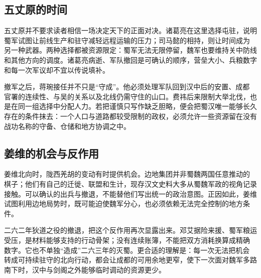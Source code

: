 \subsection{五丈原的时间}

五丈原并不要求读者相信一场决定天下的正面对决。诸葛亮在这里选择屯驻，说明
蜀军试图让前线生产和驻守减轻远程运输的压力；司马懿的相持，则让时间成为
另一种武器。两种选择都被资源限定：蜀军无法无限停留，魏军也要维持关中防线
和其他方向的调度。诸葛亮病逝、军队撤回是可确认的顺序，营垒大小、兵粮数字
和每一次军议却不宜以传说填补。

撤军之后，蒋琬接任并不只是“守成”。他必须处理军队回到汉中后的安置、成都
官署的连续性、与吴的关系以及北线仍需守住的山口。费祎后来限制大举北伐，也
是在同一组选择中分配人力。若把谨慎只写作缺乏胆略，便会把蜀汉唯一能够长久
存在的条件抹去：一个人口与道路都较受限制的政权，必须允许一些资源留在没有
战功名称的守备、仓储和地方协调之中。

\subsection{姜维的机会与反作用}

姜维北向时，陇西羌胡的变动有时提供机会。边地集团并非蜀魏两国任意推动的
棋子；他们有自己的迁徙、联盟和生计，现存汉文史料大多从蜀魏军政的视角记录
接触。可以确认的出兵与撤退，不能替他们写出统一的政治意图。正因如此，姜维
试图利用边地局势时，既可能迫使魏军分心，也必须依赖无法完全控制的地方条件。

二六二年狄道之役的撤退，把这个反作用再次显露出来。邓艾据险来援、蜀军粮运
受压，是材料能够支持的行动骨架；没有连续账簿，不能把双方消耗换算成精确
数字。它也不单独“造成”二六三年的灭蜀。更合适的理解是：每一次无法把机会
转成可持续驻守的北向行动，都会让成都的可用余地更窄，使下一次面对魏军多路
南下时，汉中与剑阁之外能够临时调动的资源更少。
